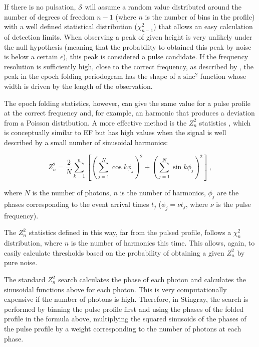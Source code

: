 \documentclass[twocolumn]{aastex62}
\newcommand{\zsq}{\ensuremath{Z^2_n}\xspace}
\begin{document}
If there is no pulsation, $\mathcal{S}$ will assume a random value distributed around the number of degrees of freedom $n - 1$ (where $n$ is the number of bins in the profile) with a well defined statistical distribution ($\chi^2_{n - 1}$) that allows an easy calculation of detection limits. 
When observing a peak of given height is very unlikely under the null hypothesis (meaning that the probability to obtained this peak by noise is below a certain $\epsilon$), this peak is considered a pulse candidate.
If the frequency resolution is sufficiently high, close to the correct frequency, as described by \citep{leahy1983b,leahy1987}, the peak in the epoch folding periodogram has the shape of a $\mathrm{sinc}^2$ function whose width is driven by the length of the observation.

The epoch folding statistics, however, can give the same value for a pulse profile at the correct frequency and, for example, an harmonic that produces a deviation from a Poisson distribution.
A more effective method is the $Z^2_n$ statistics \citep{buccheri1983}, which is conceptually similar to EF but has high values when the signal is well described by a small number of sinusoidal harmonics: 

\begin{equation}
\zsq = \dfrac{2}{N} \sum_{k=1}^n \left[{\left(\sum_{j=1}^N \cos k \phi_j\right)}^2 + {\left(\sum_{j=1}^N \sin k \phi_j\right)}^2\right] \; ,
\end{equation}

\noindent where $N$ is the number of photons, $n$ is the number of harmonics, $\phi_j$ are the phases corresponding to the event arrival times $t_j$ ($\phi_j = \nu t_j$, where $\nu$ is the pulse frequency).

The \zsq statistics defined in this way, far from the pulsed profile, follows a $\chi^2_n$ distribution, where $n$ is the number of harmonics this time.
This allows, again, to easily calculate thresholds based on the probability of obtaining a given \zsq by pure noise.

The standard \zsq search calculates the phase of each photon and calculates the sinusoidal functions above for each photon.
This is very computationally expensive if the number of photons is high. 
Therefore, in Stingray, the search is performed by binning the pulse profile first and using the phases of the folded profile in the formula above, multiplying the squared sinusoids of the phases of the pulse profile by a weight corresponding to the number of photons at each phase.
\end{document}
